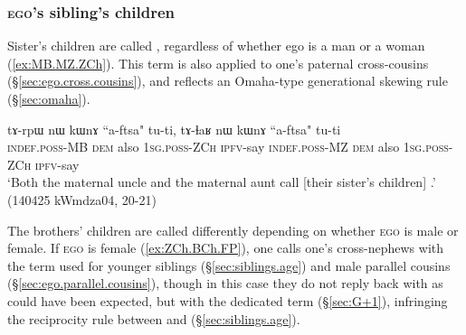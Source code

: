 \subsubsection{\textsc{ego}'s sibling's children} \label{sec:nephews}
Sister's children are called , regardless of whether ego is a man or a woman (\ref{ex:MB.MZ.ZCh}). This term is also applied to one's paternal cross-cousins (§\ref{sec:ego.cross.cousins}), and reflects an Omaha-type generational skewing rule (§\ref{sec:omaha}).

\begin{exe}
\ex \label{ex:MB.MZ.ZCh}
\gll tɤ-rpɯ nɯ kɯnɤ ``a-ftsa" tu-ti, tɤ-ɬaʁ nɯ kɯnɤ ``a-ftsa" tu-ti \\
\textsc{indef}.\textsc{poss}-MB \textsc{dem} also \textsc{1sg}.\textsc{poss}-\textsc{ZCh} \textsc{ipfv}-say \textsc{indef}.\textsc{poss}-MZ \textsc{dem} also \textsc{1sg}.\textsc{poss}-\textsc{ZCh} \textsc{ipfv}-say \\
\glt `Both the maternal uncle and the maternal aunt call [their sister's children] .'  (140425 kWmdza04, 20-21)
\end{exe}

The brothers' children are called differently depending on whether \textsc{ego} is male or female. If \textsc{ego} is female (\ref{ex:ZCh.BCh.FP}), one calls one's cross-nephews with the term  used for younger siblings (§\ref{sec:siblings.age}) and male parallel cousins (§\ref{sec:ego.parallel.cousins}), though in this case they do not reply back with  as could have been expected, but with the dedicated term  (§\ref{sec:G+1}), infringing the reciprocity rule between  and  (§\ref{sec:siblings.age}).


